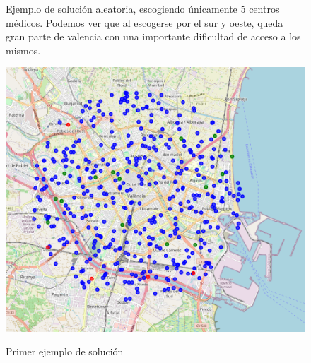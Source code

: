 \documentclass[12pt,a4paper]{book}
\begin{document}
\begin{figure}[H]
    \centering
    \begin{minipage}[c]{0.45\textwidth}
        Ejemplo de solución aleatoria, escogiendo únicamente 5 centros médicos. Podemos ver que al escogerse por el sur y oeste, queda gran parte de valencia con una importante dificultad de acceso a los mismos.
    \end{minipage}
    \hfill
    \begin{minipage}[c]{0.45\textwidth}
        \includegraphics[width=\textwidth]{images/solucion_ejemplo_1.png}
        \label{fig:ejemplo_1}
    \end{minipage}
    \caption{Primer ejemplo de solución}
\end{figure}
\end{document}
